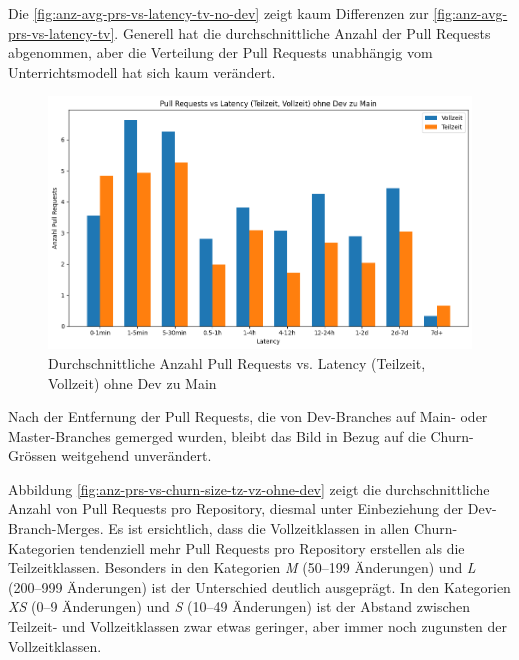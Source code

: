 Die \autoref{fig:anz-avg-prs-vs-latency-tv-no-dev} zeigt kaum Differenzen zur \autoref{fig:anz-avg-prs-vs-latency-tv}. Generell hat die durchschnittliche Anzahl der Pull Requests abgenommen, aber die Verteilung der Pull Requests unabhängig vom Unterrichtsmodell hat sich kaum verändert. 

\begin{figure}[htbp]
    \includegraphics[width=\textwidth]{Figures/anz-avg-prs-vs-latency-tv-no-dev.png}
    \caption{Durchschnittliche Anzahl Pull Requests vs. Latency (Teilzeit, Vollzeit) ohne Dev zu Main}
    \label{fig:anz-avg-prs-vs-latency-tv-no-dev}
\end{figure}
\newpage

Nach der Entfernung der Pull Requests, die von Dev-Branches auf Main- oder Master-Branches gemerged wurden, bleibt das Bild in Bezug auf die Churn-Grössen weitgehend unverändert.

Abbildung \autoref{fig:anz-prs-vs-churn-size-tz-vz-ohne-dev} zeigt die durchschnittliche Anzahl von Pull Requests pro Repository, diesmal unter Einbeziehung der Dev-Branch-Merges. Es ist ersichtlich, dass die Vollzeitklassen in allen Churn-Kategorien tendenziell mehr Pull Requests pro Repository erstellen als die Teilzeitklassen. Besonders in den Kategorien \textit{M} (50–199 Änderungen) und \textit{L} (200–999 Änderungen) ist der Unterschied deutlich ausgeprägt. In den Kategorien \textit{XS} (0–9 Änderungen) und \textit{S} (10–49 Änderungen) ist der Abstand zwischen Teilzeit- und Vollzeitklassen zwar etwas geringer, aber immer noch zugunsten der Vollzeitklassen.

